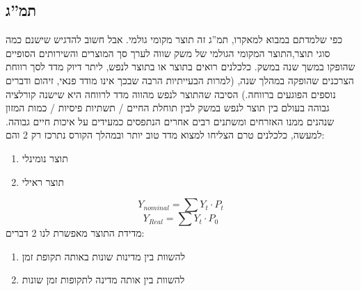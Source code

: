 \documentclass[a4paper,12pt]{article}
\begin{document}
\begin{RTL}
\begin{hebrew}
\section{תמ''ג}
כפי שלמדתם במבוא למאקרו, תמ''ג זה תוצר מקומי גולמי. אבל חשוב להדגיש שישנם כמה סוגי תוצר,התוצר המקומי הגולמי של משק שווה לערך סך המוצרים והשירותים הסופיים שהופקו במשך שנה במשק.
כלכלנים רואים בתוצר או בתוצר לנפש, ליתר דיוק  מדד לסך רווחת הצרכנים שהופקה במהלך שנה, (למרות
הבעייתיות הרבה שבכך אינו מודד פנאי, זיהום ודברים נוספים הפוגעים ברווחה.) הסיבה שהתוצר לנפש
מהווה מדד לרווחה היא שישנה קורלציה גבוהה בעולם בין תוצר לנפש במשק לבין תוחלת החיים / תשתיות
פיסיות / כמות המזון שנהנים ממנו האזרחים ומשתנים רבים אחרים הנתפסים כמעידים על איכות חיים
גבוהה. למעשה, כלכלנים טרם הצליחו למצוא מדד טוב יותר ובמהלך הקורס נתרכז רק 2 והם:    
\begin{enumerate}
    \item תוצר נומינלי
    \item תוצר ראילי
\end{enumerate}
\begin{equation*}
    Y_{{nominal}}=\sum Y_t \cdot P_t
\end{equation*}
\begin{equation*}
    Y_{{Real}}=\sum Y_t \cdot P_0
\end{equation*}
מדידת התוצר מאפשרת לנו 2 דברים:
\begin{enumerate}

    \item להשוות בין מדינות שונות באותה תקופת זמן
    \item להשוות בין אותה מדינה לתקופות זמן שונות
\end{enumerate}


\end{hebrew}
\end{RTL}
\end{document}
